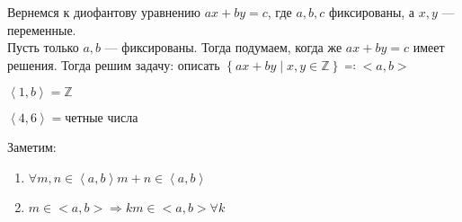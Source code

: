 Вернемся к диофантову уравнению $ax+by=c$, где  $a,b,c$ фиксированы, а  $x, y$ --- переменные. \\
Пусть только  $a, b$ --- фиксированы. Тогда подумаем, когда же  $ax + by = c$ имеет решения. Тогда решим задачу: описать $\left\{ ax+by \; \vert \; x,y \in \mathbb{Z} \right\} \eqqcolon <a, b>$
 \begin{example}
     $\left<1,b\right> = \mathbb{Z}$ \\
\end{example}
\begin{example}
         $\left<4, 6\right> = \text{четные числа}$ 
\end{example}
Заметим: 
\begin{enumerate}
    \item
        $\forall m, n \in \left<a,b\right> m + n \in\left<a,b\right>$
    \item
        $m \in <a,b> \Rightarrow km \in <a,b> \forall k$
\end{enumerate}

